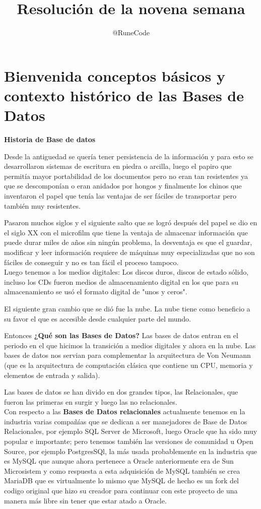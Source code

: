 \documentclass{article}
\title{Resolución de la novena semana}
\author{@RuneCode}
\begin{document}


\section{Bienvenida conceptos básicos y contexto histórico de las Bases de Datos}%

\textbf{Historia de Base de datos}

Desde la antiguedad se quería tener persistencia de la información y para esto
se desarrollaron sistemas de escritura en piedra o arcilla, luego el papiro que
permitía mayor portabilidad de los documentos pero no eran tan resistentes ya
que se descomponían o eran anidados por hongos y finalmente los chinos que
inventaron el papel que tenía las ventajas de ser fáciles de transportar pero
también muy resistentes.

Pasaron muchos siglos y el siguiente salto que se logró después del papel se
dio en el siglo XX con el microfilm que tiene la ventaja de almacenar
información que puede durar miles de años sin ningún problema, la desventaja es
que el guardar, modificar y leer información requiere de máquinas muy
especializadas que no son fáciles de conseguir y no es tan fácil el proceso
tampoco.\\

Luego tenemos a los medios digitales: Los discos duros, discos de estado
sólido, incluso los CDs fueron medios de almacenamiento digital en los que para
su almacenamiento se usó el formato digital de "unos y ceros".

El siguiente gran cambio que se dió fue la nube. La nube tiene como beneficio a
su favor el que es accesible desde cualquier parte del mundo.

Entonces \textbf{¿Qué son las Bases de Datos?}
Las bases de datos entran en el periodo en el que hicimos la transición a
medios digitales y ahora en la nube.
Las bases de datos nos servian para complementar la arquitectura de Von Neumann
(que es la arquitectura de computación clásica que contiene un CPU, memoria y
elementos de entrada y salida).

Las bases de datos se han divido en dos grandes tipos, las Relacionales, que
fueron las primeras en surgir y luego las no relacionales.\\

Con respecto a las \textbf{Bases de Datos relacionales} actualmente tenemos en
la industria varias compañías que se dedican a ser manejadores de Base de Datos
Relacionales, por ejemplo SQL Server de Microsoft, luego Oracle que ha sido muy
popular e importante; pero tenemos también las versiones de comunidad u Open
Source, por ejemplo PostgresSQl, la más usada probablemente en la industria que
es MySQL que aunque ahora pertenece a Oracle anteriormente era de Sun
Microsistem y como respuesta a esta adquisición de MySQL también se crea
MariaDB que es virtualmente lo mismo que MySQL de hecho es un fork del codigo
original que hizo su creador para continuar con este proyecto de una manera más
libre sin tener que estar atado a Oracle.
\end{document}
